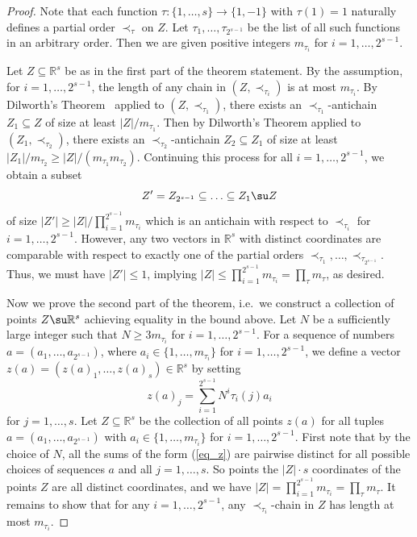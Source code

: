 \begin{proof}
Note that each function $\tau:\{1, \ldots, s\}\rightarrow \{1,-1\}$ with $\tau(1) = 1$ naturally defines a partial order $\prec_{\tau}$ on $Z$. Let $\tau_1, \ldots, \tau_{2^{s-1}}$ be the list of all such functions in an arbitrary order. Then we are given positive integers $m_{\tau_i}$ for $i=1,\dots,2^{s-1}$.

Let $Z \subseteq \mathbb R^s$ be as in the first part of the theorem statement. By the assumption, for $i=1,\dots,2^{s-1}$, the length of any chain in $(Z, \prec_{\tau_i})$ is at most $m_{\tau_i}$. 
 By Dilworth's Theorem~\cite{Dil} applied to $(Z, \prec_{\tau_1})$, there exists an $\prec_{\tau_1}$-antichain $Z_1 \subseteq Z$ of size at least $|Z| / m_{\tau_1}$. Then by Dilworth's Theorem applied to $(Z_1, \prec_{\tau_2})$, there exists an $\prec_{\tau_2}$-antichain $Z_2 \subseteq Z_1$ of size at least $|Z_1| / m_{\tau_2} \ge |Z|/(m_{\tau_1}m_{\tau_2})$. Continuing this process for all $i=1, \ldots, 2^{s-1}$, we obtain a subset
\[Z' = Z_{2^{s-1}} \subseteq \ldots \subseteq Z_1\su Z\]
of size $|Z'|\ge |Z|/\prod_{i=1}^{2^{s-1}} m_{\tau_i}$ which is an antichain with respect to $\prec_{\tau_i}$ for $i=1,\dots,2^{s-1}$. However, any two vectors in $\mathbb R^s$ with distinct coordinates are comparable with respect to exactly one of the partial orders $\prec_{\tau_1},\dots,\prec_{\tau_{2^{s-1}}}$. Thus, we must have $|Z'|\le 1$, implying $|Z|\le \prod_{i=1}^{2^{s-1}} m_{\tau_i}=\prod_\tau m_{\tau}$, as desired. 

Now we prove the second part of the theorem, i.e.\ we construct a collection of points $Z\su \mathbb{R}^s$ achieving equality in the bound above. Let $N$ be a sufficiently large integer such that $N\ge 3m_{\tau_i}$ for $i=1,\dots,2^{s-1}$. For a sequence of numbers $a = (a_1, \ldots, a_{2^{s-1}})$, where $a_i \in \{1, \ldots, m_{\tau_i}\}$ for $i=1, \ldots, 2^{s-1}$, we define a vector $z(a) = (z(a)_1, \ldots, z(a)_s) \in \mathbb R^s$ by setting
\begin{equation}\label{eq_z}
z(a)_j = \sum_{i=1}^{2^{s-1}} N^{i} \tau_i(j) a_{i}
\end{equation}
for $j=1,\dots,s$. Let $Z \subseteq \mathbb R^s$ be the collection of all points $z(a)$ for all tuples $a = (a_1, \ldots, a_{2^{s-1}})$ with $a_i \in \{1, \ldots, m_{\tau_i}\}$ for $i=1, \ldots, 2^{s-1}$. First note that by the choice of $N$, all the sums of the form (\ref{eq_z}) are pairwise distinct for all possible choices of sequences $a$ and all $j=1,\dots,s$. So points the $|Z|\cdot s$ coordinates of the points $Z$ are all distinct coordinates, and we have $|Z| = \prod_{i=1}^{2^{s-1}} m_{\tau_i}=\prod_\tau m_\tau$. It remains to show that for any $i = 1, \ldots, 2^{s-1}$, any $\prec_{\tau_i}$-chain in $Z$ has length at most $m_{\tau_i}$. 


\end{proof}
